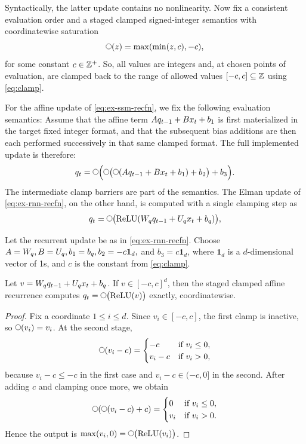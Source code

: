 \documentclass{article}
\begin{document}
Syntactically, the latter update contains no nonlinearity. 
Now fix a consistent evaluation order and a staged clamped signed-integer semantics with coordinatewise saturation
\begin{equation}\label{eq:clamp}
    \wrap(z)=\max(\min(z,c),-c),
\end{equation}
for some constant $c\in\mathbb{Z}^+$. 
So, all values are integers and, at chosen points of evaluation, are clamped back to the range of allowed values $[-c,c]\subseteq \mathbb{Z}$ using \cref{eq:clamp}.

For the affine update of \cref{eq:ex-ssm-recfn}, we fix the following evaluation semantics:
Assume that the affine term $A q_{t-1}+Bx_t+b_1$ is first materialized in the target fixed integer format, and that the subsequent bias additions are then each performed successively in that same clamped format. The full implemented update is therefore:
\begin{equation*}
\state_\tstep=\wrap\Big(\wrap\big(\wrap(A \state_{\tstep-1}+B\insym_\tstep+b_1)+b_2\big)+b_3\Big).
\end{equation*}
The intermediate clamp barriers are part of the semantics.
The Elman update of \cref{eq:ex-rnn-recfn}, on the other hand, is computed with a single clamping step as
\begin{equation*}\label{eq:elman-clamp}
\state_\tstep=\wrap\big(
\mathrm{ReLU}(W_\state \state_{\tstep-1}+U_\state \insym_\tstep+b_\state)\big),    
\end{equation*}

\begin{proposition}\label{prop:linear-relu}
Let the recurrent update be as in \cref{eq:ex-rnn-recfn}.
Choose $A=W_q, B=U_q, b_1=b_q, b_2=-c\mathbf{1}_d,$ and $b_3=c\mathbf{1}_d$, where $\mathbf{1}_d$ is a $d$-dimensional vector of 1s, and $c$ is the constant from \cref{eq:clamp}.

Let $v = W_q q_{t-1}+U_q x_t+b_q$. 
If $v\in[-c,c]^d$, then the staged clamped affine recurrence computes $\state_\tstep=\wrap\big(\text{ReLU}(v)\big)$ exactly, coordinatewise.
\end{proposition}

\begin{proof}
Fix a coordinate $1\leq i\leq d$. Since $v_i\in[-c,c]$, the first clamp is inactive, so $\wrap(v_i)=v_i$. At the second stage,
$$
\wrap(v_i-c)=
\begin{cases}
-c & \text{if } v_i\le 0,\\
v_i-c & \text{if } v_i>0,
\end{cases}
$$
because $v_i-c\le -c$ in the first case and $v_i-c\in(-c,0]$ in the second. After adding $c$ and clamping once more, we obtain
$$
\wrap(\wrap(v_i-c)+c)=
\begin{cases}
0 & \text{if } v_i\le 0,\\
v_i & \text{if } v_i>0.
\end{cases}
$$
Hence the output is $\max(v_i,0)=\wrap\big(\text{ReLU}(v_i)\big)$. 
\end{proof}
\end{document}

